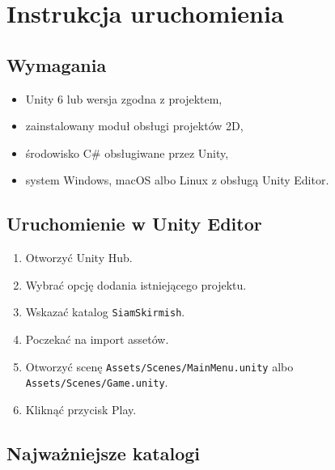 \documentclass[12pt,a4paper]{article}
\begin{document}
\newpage

\section{Instrukcja uruchomienia}

\subsection{Wymagania}

\begin{itemize}
    \item Unity 6 lub wersja zgodna z projektem,
    \item zainstalowany moduł obsługi projektów 2D,
    \item środowisko C\# obsługiwane przez Unity,
    \item system Windows, macOS albo Linux z obsługą Unity Editor.
\end{itemize}

\subsection{Uruchomienie w Unity Editor}

\begin{enumerate}
    \item Otworzyć Unity Hub.
    \item Wybrać opcję dodania istniejącego projektu.
    \item Wskazać katalog \texttt{SiamSkirmish}.
    \item Poczekać na import assetów.
    \item Otworzyć scenę \texttt{Assets/Scenes/MainMenu.unity} albo \texttt{Assets/Scenes/Game.unity}.
    \item Kliknąć przycisk Play.
\end{enumerate}

\subsection{Najważniejsze katalogi}
\end{document}
